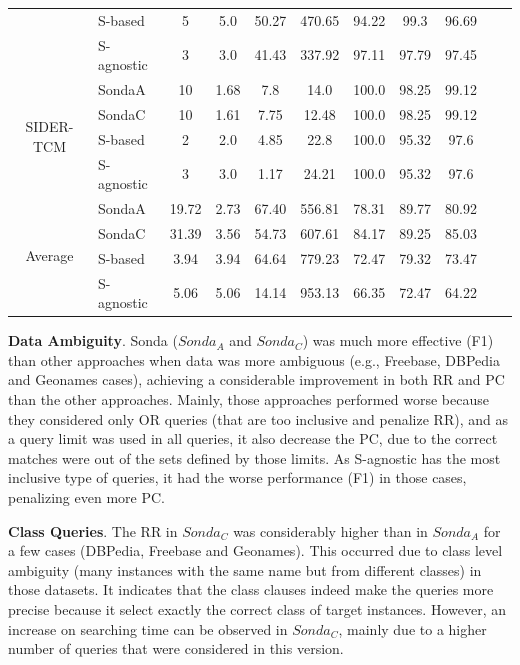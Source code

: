 \begin{center}
\begin{table}[h]
\begin{tabular}{|c|l|c|c|c|c|c|c|c|c|c|}
 & S-based  & 5 & 5.0   & 50.27  & 470.65 & 94.22 & 99.3 & 96.69  \\
 & S-agnostic  & 3 & 3.0   & 41.43  & 337.92 & 97.11 & 97.79 & 97.45  \\ \hline
\multirow{4}{*}{SIDER-TCM}  & SondaA  & 10 & 1.68   & 7.8  & 14.0 & 100.0 & 98.25 & 99.12  \\
 & SondaC  & 10 & 1.61   & 7.75  & 12.48 & 100.0 & 98.25 & 99.12  \\
 & S-based  & 2 & 2.0   & 4.85  & 22.8 & 100.0 & 95.32 & 97.6  \\
 & S-agnostic  & 3 & 3.0   & 1.17  & 24.21 & 100.0 & 95.32 & 97.6  \\ \hline	
 \multirow{4}{*}{Average}  & SondaA  &  19.72	& 2.73 & 	67.40 & 	556.81 & 	78.31 & 	89.77 & 	80.92\\
 & SondaC  & 31.39	& 3.56 &	54.73 & 	607.61	& 84.17	& 89.25 & 	85.03 \\
 & S-based  & 3.94	& 3.94	& 	64.64	& 	779.23	& 	72.47	& 	79.32	& 	73.47\\
  & S-agnostic  & 5.06 &  	5.06	 & 14.14 & 	953.13	 & 66.35	 & 72.47 & 	64.22\\ \hline	
 
\end{tabular}  
\end{table} 
\end{center}

\textbf{Data Ambiguity}. Sonda ($Sonda_A$ and $Sonda_C$) was much more effective (F1) than other approaches when data was more ambiguous  (e.g., Freebase, DBPedia and Geonames cases), achieving a considerable improvement in both RR and PC than the other approaches. Mainly, those approaches performed worse because they considered only OR queries (that are too inclusive and penalize RR),  and as a query limit was used in all queries, it also decrease the PC, due to the correct matches were out of the sets defined by those limits. As S-agnostic has the most inclusive type of queries, it had the worse performance (F1) in those cases, penalizing even more PC.

\textbf{Class Queries}. The RR in $Sonda_C$ was considerably higher than in $Sonda_A$ for a few cases (DBPedia, Freebase and Geonames). This occurred due to class level ambiguity (many instances with the same name but from different classes) in those datasets. It indicates that the class clauses indeed make the queries more precise because it select exactly the correct class of target instances. However, an increase on searching time can be observed in $Sonda_C$, mainly due to a higher number of queries that were considered in this version.

